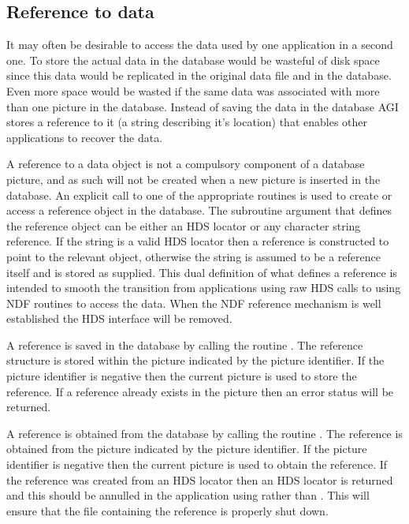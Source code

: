 \documentclass[twoside,11pt]{starlink}
\begin{document}
\subsection{Reference to data}
It may often be desirable to access the data used by one application
in a second one. To store the actual data in the database would be wasteful
of disk space since this data would be replicated in the original data file
and in the database. Even more space would be wasted if the same data
was associated with more than one picture in the database. Instead of
saving the data in the database AGI stores a reference to it (a string
describing it's location) that enables other applications to recover the
data.

A reference to a data object is not a compulsory component of a database
picture, and as such will not be created when a new picture is inserted
in the database.
An explicit call to one of the appropriate routines is used
to create or access a reference object in the database.
The subroutine argument that defines the reference object can be either
an HDS locator or any character string reference. If the string is a
valid HDS locator then a reference is constructed to point to the
relevant object, otherwise the string is assumed to be a reference
itself and is stored as supplied. This dual definition of what defines
a reference is intended to smooth the transition from applications
using raw HDS calls to using NDF routines to access the data. When the
NDF reference mechanism is well established the HDS interface will be
removed.

A reference is saved in the database by calling the routine
. The reference
structure is stored within the picture indicated by the picture
identifier. If the picture identifier is negative then the current
picture is used to store the reference. If a reference already exists
in the picture then an error status will be returned.

A reference is obtained from the database by calling the routine
.
The reference is obtained from the picture indicated
by the picture identifier. If the picture identifier is negative then
the current picture is used to obtain the reference.
If the reference was created from an HDS locator then an HDS locator
is returned and this should be annulled in the application using
rather than . This will ensure that
the file containing the reference is properly shut down.
\end{document}
